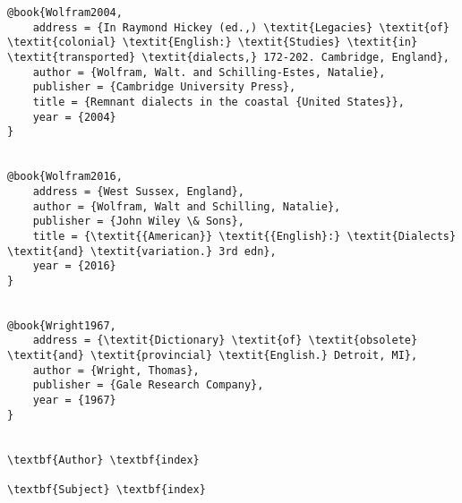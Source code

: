 \begin{verbatim}
@book{Wolfram2004,
	address = {In Raymond Hickey (ed.,) \textit{Legacies} \textit{of} \textit{colonial} \textit{English:} \textit{Studies} \textit{in} \textit{transported} \textit{dialects,} 172-202. Cambridge, England},
	author = {Wolfram, Walt. and Schilling-Estes, Natalie},
	publisher = {Cambridge University Press},
	title = {Remnant dialects in the coastal {United States}},
	year = {2004}
}


@book{Wolfram2016,
	address = {West Sussex, England},
	author = {Wolfram, Walt and Schilling, Natalie},
	publisher = {John Wiley \& Sons},
	title = {\textit{{American}} \textit{{English}:} \textit{Dialects} \textit{and} \textit{variation.} 3rd edn},
	year = {2016}
}


@book{Wright1967,
	address = {\textit{Dictionary} \textit{of} \textit{obsolete} \textit{and} \textit{provincial} \textit{English.} Detroit, MI},
	author = {Wright, Thomas},
	publisher = {Gale Research Company},
	year = {1967}
}


\textbf{Author} \textbf{index}

\textbf{Subject} \textbf{index}

\end{verbatim}